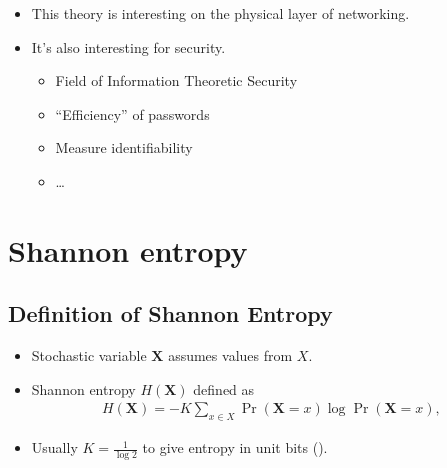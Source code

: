 \documentclass{beamer}
\let\stoch\mathbf{}
\begin{document}
\begin{frame}
  \begin{itemize}
    \item This theory is interesting on the physical layer of networking.

      \pause{}

    \item It's also interesting for security.
      \begin{itemize}
        \item Field of Information Theoretic Security
        \item \enquote{Efficiency} of passwords
        \item Measure identifiability
        \item \dots
      \end{itemize}
  \end{itemize}
\end{frame}





\section{Shannon entropy}

\subsection{Definition of Shannon Entropy}

\begin{frame}
  \begin{definition}
    \begin{itemize}
      \item Stochastic variable \(\stoch X\) assumes values from \(X\).
      \item Shannon entropy \(H(\stoch X)\) defined as
        \begin{align*}
          H(\stoch X) = -K \sum_{x\in X} \Pr(\stoch X = x)\log \Pr(\stoch X = x),
        \end{align*}
      \item Usually \(K = \frac{1}{\log 2}\) to give entropy in unit bits  
        (\si{\bit}).
    \end{itemize}
  \end{definition}
\end{frame}
\end{document}
